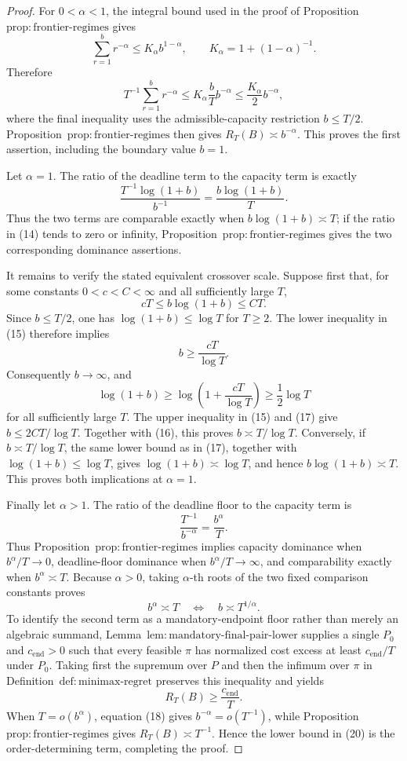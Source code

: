 \documentclass{article}
\begin{document}
\begin{proof}
For \(0<\alpha<1\), the integral bound used in the proof of Proposition~\(\mathrm{prop:frontier\text{-}regimes}\) gives
\[
\sum_{r=1}^{b}r^{-\alpha}
\le K_\alpha b^{1-\alpha},
\qquad
K_\alpha=1+(1-\alpha)^{-1}.
\]
Therefore
\[
T^{-1}\sum_{r=1}^{b}r^{-\alpha}
\le K_\alpha\frac bT b^{-\alpha}
\le \frac{K_\alpha}{2}b^{-\alpha}, \tag{13}
\]
where the final inequality uses the admissible-capacity restriction \(b\le T/2\).  Proposition~\(\mathrm{prop:frontier\text{-}regimes}\) then gives \(R_T(B)\asymp b^{-\alpha}\).  This proves the first assertion, including the boundary value \(b=1\).

Let \(\alpha=1\).  The ratio of the deadline term to the capacity term is exactly
\[
\frac{T^{-1}\log(1+b)}{b^{-1}}
=\frac{b\log(1+b)}{T}. \tag{14}
\]
Thus the two terms are comparable exactly when \(b\log(1+b)\asymp T\); if the ratio in (14) tends to zero or infinity, Proposition~\(\mathrm{prop:frontier\text{-}regimes}\) gives the two corresponding dominance assertions.

It remains to verify the stated equivalent crossover scale.  Suppose first that, for some constants \(0<c<C<\infty\) and all sufficiently large \(T\),
\[
cT\le b\log(1+b)\le CT. \tag{15}
\]
Since \(b\le T/2\), one has \(\log(1+b)\le\log T\) for \(T\ge2\).  The lower inequality in (15) therefore implies
\[
b\ge \frac{cT}{\log T}. \tag{16}
\]
Consequently \(b\to\infty\), and
\[
\log(1+b)
\ge \log\!\left(1+\frac{cT}{\log T}\right)
\ge \frac12\log T \tag{17}
\]
for all sufficiently large \(T\).  The upper inequality in (15) and (17) give \(b\le 2CT/\log T\).  Together with (16), this proves \(b\asymp T/\log T\).  Conversely, if \(b\asymp T/\log T\), the same lower bound as in (17), together with \(\log(1+b)\le\log T\), gives \(\log(1+b)\asymp\log T\), and hence \(b\log(1+b)\asymp T\).  This proves both implications at \(\alpha=1\).

Finally let \(\alpha>1\).  The ratio of the deadline floor to the capacity term is
\[
\frac{T^{-1}}{b^{-\alpha}}=\frac{b^\alpha}{T}. \tag{18}
\]
Thus Proposition~\(\mathrm{prop:frontier\text{-}regimes}\) implies capacity dominance when \(b^\alpha/T\to0\), deadline-floor dominance when \(b^\alpha/T\to\infty\), and comparability exactly when \(b^\alpha\asymp T\).  Because \(\alpha>0\), taking \(\alpha\)-th roots of the two fixed comparison constants proves
\[
b^\alpha\asymp T
\quad\Longleftrightarrow\quad
b\asymp T^{1/\alpha}. \tag{19}
\]
To identify the second term as a mandatory-endpoint floor rather than merely an algebraic summand, Lemma~\(\mathrm{lem:mandatory\text{-}final\text{-}pair\text{-}lower}\) supplies a single \(P_0\) and \(c_{\mathrm{end}}>0\) such that every feasible \(\pi\) has normalized cost excess at least \(c_{\mathrm{end}}/T\) under \(P_0\).  Taking first the supremum over \(P\) and then the infimum over \(\pi\) in Definition~\(\mathrm{def:minimax\text{-}regret}\) preserves this inequality and yields
\[
R_T(B)\ge \frac{c_{\mathrm{end}}}{T}. \tag{20}
\]
When \(T=o(b^\alpha)\), equation (18) gives \(b^{-\alpha}=o(T^{-1})\), while Proposition~\(\mathrm{prop:frontier\text{-}regimes}\) gives \(R_T(B)\asymp T^{-1}\).  Hence the lower bound in (20) is the order-determining term, completing the proof.
\end{proof}
\end{document}
